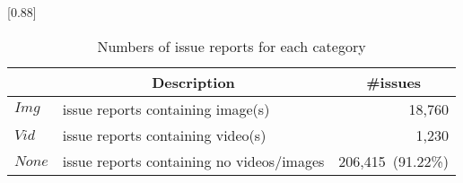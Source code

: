 
\begin{table}[t]
    \begin{center}
    \caption{Numbers of issue reports for each category}
    \scalebox{0.88}[0.88]{
    \begin{tabular}{llr}
        \toprule
         & \multicolumn{1}{c}{\textbf{Description}} & \multicolumn{1}{c}{\textbf{\#issues}} \\
        \midrule
        $Img$  & issue reports containing image(s) & 18,760\hspace{2.5mm}{\small (9.09\%)}\\%
        $Vid$  & issue reports containing video(s) & 1,230\hspace{2.5mm}{\small (0.54\%)}\\%
        $None$ & issue reports containing no videos/images & 206,415~{\small (91.22\%)}\\ 
        \bottomrule
    \end{tabular}
    }
    \label{tab:issue-category}
    \end{center}
    
\end{table}
